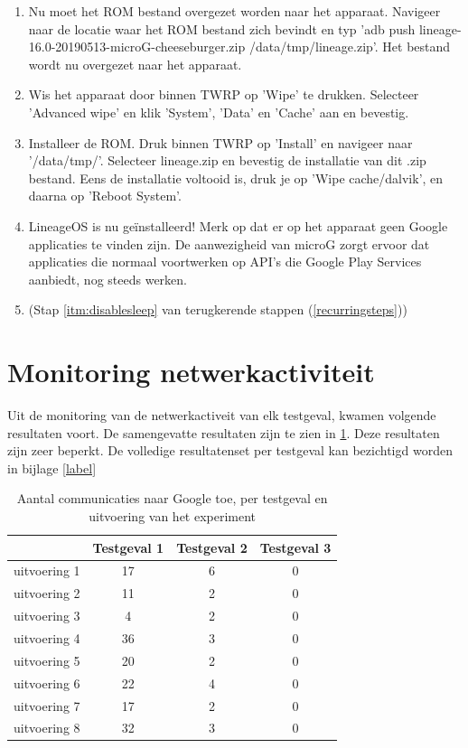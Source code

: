 \begin{enumerate}
    \item Nu moet het ROM bestand overgezet worden naar het apparaat. Navigeer naar de locatie waar het ROM bestand zich bevindt en typ 'adb push lineage-16.0-20190513-microG-cheeseburger.zip /data/tmp/lineage.zip'. Het bestand wordt nu overgezet naar het apparaat.
    
    \item Wis het apparaat door binnen TWRP op 'Wipe' te drukken. Selecteer 'Advanced wipe' en klik 'System', 'Data' en 'Cache' aan en bevestig.
    
    \item Installeer de ROM. Druk binnen TWRP op 'Install' en navigeer naar '/data/tmp/'. Selecteer lineage.zip en bevestig de installatie van dit .zip bestand. Eens de installatie voltooid is, druk je op 'Wipe cache/dalvik', en daarna op 'Reboot System'.
    
    \item 
    LineageOS is nu geïnstalleerd! Merk op dat er op het apparaat geen Google applicaties te vinden zijn. De aanwezigheid van microG zorgt ervoor dat applicaties die normaal voortwerken op API's die Google Play Services aanbiedt, nog steeds werken.
    
    \item 
     (Stap \ref{itm:disablesleep} van terugkerende stappen (\ref{recurringsteps}))
\end{enumerate}

\section{Monitoring netwerkactiviteit}

Uit de monitoring van de netwerkactiveit van elk testgeval, kwamen volgende resultaten voort. De samengevatte resultaten zijn te zien in \ref{tab:resumed}. Deze resultaten zijn zeer beperkt. De volledige resultatenset per testgeval kan bezichtigd worden in bijlage \ref{label} %

\begin{table}[]
    \centering
    \begin{tabular}{@{}rccc@{}}
        \toprule
        \multicolumn{1}{l}{} & Testgeval 1 & Testgeval 2 & Testgeval 3 \\ \midrule
        uitvoering 1 & 17 & 6 & 0 \\
        uitvoering 2 & 11 & 2 & 0 \\
        uitvoering 3 & 4 & 2 & 0 \\
        uitvoering 4 & 36 & 3 & 0 \\
        uitvoering 5 & 20 & 2 & 0 \\
        uitvoering 6 & 22 & 4 & 0 \\
        uitvoering 7 & 17 & 2 & 0 \\
        uitvoering 8 & 32 & 3 & 0 \\ \bottomrule
    \end{tabular}
    \caption{Aantal communicaties naar Google toe, per testgeval en uitvoering van het experiment}
    \label{tab:resumed}
\end{table}

